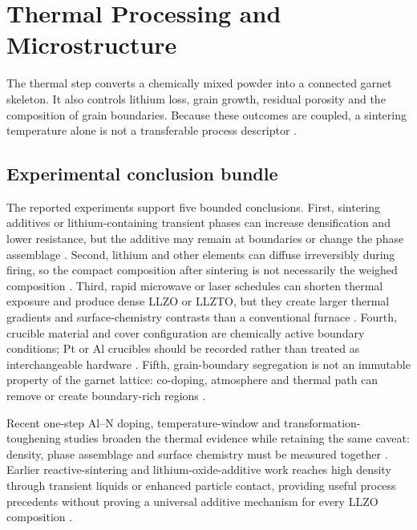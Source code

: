 \section{Thermal Processing and Microstructure}
\label{sec:densification}

The thermal step converts a chemically mixed powder into a connected garnet skeleton. It also controls lithium loss, grain growth, residual porosity and the composition of grain boundaries. Because these outcomes are coupled, a sintering temperature alone is not a transferable process descriptor \cite{janani2014influence,moy2025irreversible,chen2022processing}.

\subsection{Experimental conclusion bundle}

The reported experiments support five bounded conclusions. First, sintering additives or lithium-containing transient phases can increase densification and lower resistance, but the additive may remain at boundaries or change the phase assemblage \cite{janani2014influence,luo2019influence,park2026li2co3}. Second, lithium and other elements can diffuse irreversibly during firing, so the compact composition after sintering is not necessarily the weighed composition \cite{moy2025irreversible,gullbrekken2025phase}. Third, rapid microwave or laser schedules can shorten thermal exposure and produce dense LLZO or LLZTO, but they create larger thermal gradients and surface-chemistry contrasts than a conventional furnace \cite{aman2026susceptor,ramos2026ultrafast,zhang2024unveiling}. Fourth, crucible material and cover configuration are chemically active boundary conditions; Pt or Al crucibles should be recorded rather than treated as interchangeable hardware \cite{k2026influence}. Fifth, grain-boundary segregation is not an immutable property of the garnet lattice: co-doping, atmosphere and thermal path can remove or create boundary-rich regions \cite{ahmad2025reducing,golmohammad2024effects,yao2026elimination}.

Recent one-step Al--N doping, temperature-window and transformation-toughening studies broaden the thermal evidence while retaining the same caveat: density, phase assemblage and surface chemistry must be measured together \cite{zhang2026al,qin2026influence,lessmeier2026transformation}. Earlier reactive-sintering and lithium-oxide-additive work reaches high density through transient liquids or enhanced particle contact, providing useful process precedents without proving a universal additive mechanism for every LLZO composition \cite{li2020solid,li2013influence,jonson2018tape,zhang2022high}.

